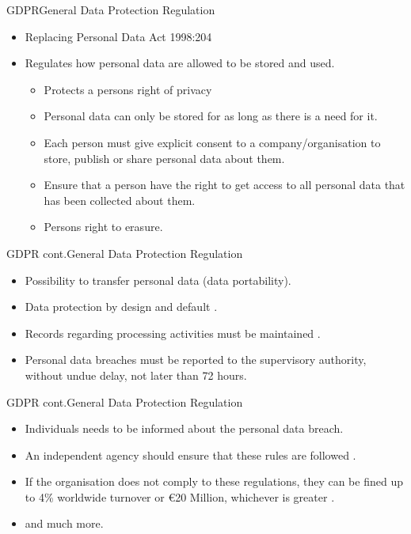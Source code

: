 \documentclass{beamer}
\begin{document}
\begin{frame}{GDPR}{General Data Protection Regulation}
  \begin{itemize}
    \item Replacing Personal Data Act 1998:204
    \item Regulates how personal data are allowed to be stored and used.
      \begin{itemize}
        \item Protects a persons right of privacy\cite[art. 5]{eu:gdpr}
        \item Personal data can only be stored for as long as there is a need
          for it\cite[art. 5]{eu:gdpr}.
        \item Each person must give explicit consent to a company/organisation
          to store, publish or share personal data about them\cite[art.
          7]{eu:gdpr}.  
        \item Ensure that a person have the right to get access
          to all personal
          data that has been collected about them\cite[art. 15]{eu:gdpr}.
        \item Persons right to erasure\cite[art. 17]{eu:gdpr}. 
      \end{itemize}
  \end{itemize}
\end{frame}
\begin{frame}{GDPR cont.}{General Data Protection Regulation}
    \begin{itemize}
      \item Possibility to transfer personal data (data
          portability)\cite[art. 20]{eu:gdpr}.  
      \item Data protection by design and default \cite[art. 25]{eu:gdpr}.
      \item Records regarding processing activities must be maintained \cite[art.
        30]{eu:gdpr}.
      \item Personal data breaches must be reported to the supervisory
        authority, without undue delay, not later than 72 hours\cite[art.
        33]{eu:gdpr}.
    \end{itemize}
\end{frame}
\begin{frame}{GDPR cont.}{General Data Protection Regulation}
\begin{itemize}
    \item Individuals needs to be informed about the personal data
        breach\cite[art. 34]{eu:gdpr}.
    \item An independent agency should ensure that these rules are followed
      \cite[art 51]{eu:gdpr}.
    \item If the organisation does not comply to these regulations, they can be
      fined up to 4\% worldwide turnover or €20 Million, whichever is greater
      \cite[art 83]{eu:gdpr}.
    \item and much more.
\end{itemize}
\end{frame}
\end{document}
